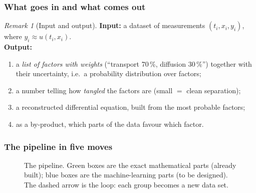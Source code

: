 \documentclass[11pt]{article}
\theoremstyle{plain}
\theoremstyle{definition}
\theoremstyle{remark}
\newtheorem{remark}[theorem]{Remark}
\newenvironment{iobox}[1]{\begin{remark}[#1]}{\end{remark}}
\begin{document}
\subsubsection*{What goes in and what comes out}
\begin{iobox}{Input and output}
\textbf{Input:} a dataset of measurements $(t_i,x_i,y_i)$, where $y_i\approx u(t_i,x_i)$.\\[2pt]
\textbf{Output:}
\begin{enumerate}[nosep,leftmargin=*]
\item a \emph{list of factors with weights} (``transport 70\,\%, diffusion 30\,\%'') together with their uncertainty, i.e.\ a probability distribution over factors;
\item a number telling how \emph{tangled} the factors are (small $=$ clean separation);
\item a reconstructed differential equation, built from the most probable factors;
\item as a by-product, which parts of the data favour which factor.
\end{enumerate}
\end{iobox}

\subsubsection*{The pipeline in five moves}
\begin{figure}[!htb]
\centering
{}
\caption{The pipeline. Green boxes are the exact mathematical parts (already built); blue boxes are the machine-learning parts (to be designed). The dashed arrow is the loop: each group becomes a new data set.}
\label{fig:pipe}
\end{figure}
\end{document}
